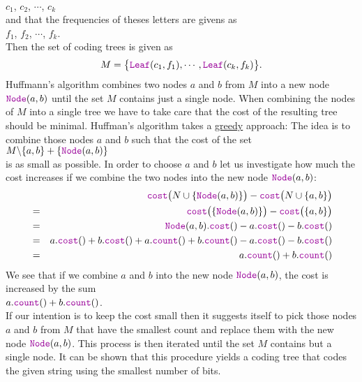 \\[0.2cm]
\hspace*{1.3cm}
$c_1$, $c_2$, $\cdots$, $c_k$
\\[0.2cm]
and that the frequencies of theses letters are givens as
\\[0.2cm]
\hspace*{1.3cm}
$f_1$, $f_2$, $\cdots$, $f_k$.
\\[0.2cm]
Then the set of coding trees is given as
\begin{equation}
  \label{eq:huffmann1}
 M = \bigl\{  \mytt{Leaf}(c_1, f_1), \cdots, \mytt{Leaf}(c_k, f_k) \bigr\}.   
\end{equation}
Huffmann's algorithm combines two nodes $a$ and $b$ from $M$ into a new node
$\mytt{Node}(a,b)$ until the set $M$ contains just a single node.  When combining the nodes of $M$ into a single
tree we have to take care that the cost of the resulting tree should be minimal.
Huffman's algorithm takes a \href{https://en.wikipedia.org/wiki/Greedy_algorithm}{greedy} approach: 
The idea is to combine those nodes $a$ and $b$ such that the cost of the set
\\[0.2cm]
\hspace*{1.3cm}
$M \symbol{92} \{a,b\} + \{ \mytt{Node}(a,b) \}$
\\[0.2cm]
is as small as possible.
In order to choose $a$ and $b$ let us investigate how much the cost increases if we combine the two nodes
into the new node $\mytt{Node}(a,b)$:
\begin{eqnarray*}
& & \mytt{cost}\bigl(N \cup \{ \mytt{Node}(a,b) \}\bigr) - \mytt{cost}\bigl(N \cup \{ a,b \}\bigr) \\
&=& \mytt{cost}\bigl( \{ \mytt{Node}(a,b) \}\bigr) - \mytt{cost}\bigl(\{ a,b \}\bigr)              \\
&=& \mytt{Node}(a,b).\mytt{cost}() - a.\mytt{cost}() - b.\mytt{cost}()                           \\
&=&   a.\mytt{cost}() + b.\mytt{cost}() + a.\mytt{count}() + b.\mytt{count}() 
    - a.\mytt{cost}() - b.\mytt{cost}()                                                              \\
&=& a.\mytt{count}() + b.\mytt{count}() 
\end{eqnarray*}
We see that if we combine $a$ and $b$ into the new node $\mytt{Node}(a,b)$, the cost is increased by the sum 
\\[0.2cm]
\hspace*{1.3cm}
$a.\mytt{count}() + b.\mytt{count}()$. 
\\[0.2cm]
If our intention is to keep the cost small then it suggests itself to pick those nodes
$a$ and $b$ from $M$ that have the smallest count and replace them with the new node
$\mytt{Node}(a,b)$.  This process is then iterated until the set $M$ contains but a single node.
It can be shown that this procedure yields a coding tree that codes the given string using the smallest number
of bits. 


